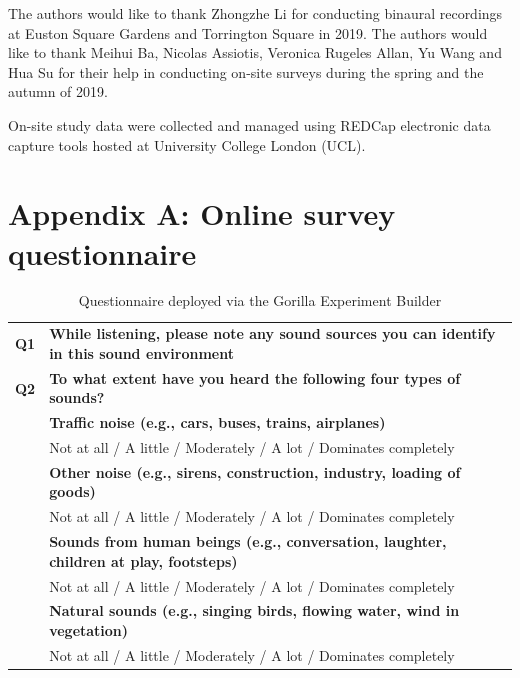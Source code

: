 \documentclass[
  authoryear,
  preprint,
  3p,
  onecolumn]{elsarticle}
\begin{document}
The authors would like to thank Zhongzhe Li for conducting binaural
recordings at Euston Square Gardens and Torrington Square in 2019. The
authors would like to thank Meihui Ba, Nicolas Assiotis, Veronica
Rugeles Allan, Yu Wang and Hua Su for their help in conducting on-site
surveys during the spring and the autumn of 2019.

On-site study data were collected and managed using REDCap electronic
data capture tools hosted at University College London (UCL).

\hypertarget{appendix-a-online-survey-questionnaire}{%
\section*{Appendix A: Online survey
questionnaire}\label{appendix-a-online-survey-questionnaire}}

\hypertarget{tbl-gorilla}{}
\begin{longtable}[]{@{}
  >{\centering\arraybackslash}p{}
  >{\raggedright\arraybackslash}p{}@{}}
\caption{\label{tbl-gorilla}Questionnaire deployed via the Gorilla
Experiment Builder}\tabularnewline
\toprule\noalign{}
\endfirsthead
\endhead
\bottomrule\noalign{}
\endlastfoot
\textbf{Q1} & \textbf{While listening, please note any sound sources you
can identify in this sound environment} \\
\textbf{Q2} & \textbf{To what extent have you heard the following four
types of sounds?} \\
& \textbf{Traffic noise (e.g., cars, buses, trains, airplanes)} \\
& Not at all / A little / Moderately / A lot / Dominates completely \\
& \textbf{Other noise (e.g., sirens, construction, industry, loading of
goods)} \\
& Not at all / A little / Moderately / A lot / Dominates completely \\
& \textbf{Sounds from human beings (e.g., conversation, laughter,
children at play, footsteps)} \\
& Not at all / A little / Moderately / A lot / Dominates completely \\
& \textbf{Natural sounds (e.g., singing birds, flowing water, wind in
vegetation)} \\
& Not at all / A little / Moderately / A lot / Dominates completely \\
\end{longtable}
\end{document}
